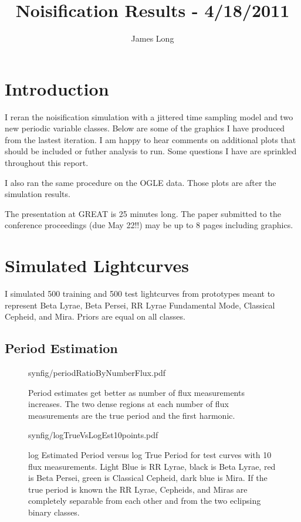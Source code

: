 \documentclass[10pt]{article}
\title{Noisification Results - 4/18/2011}
\date{}
\author{James Long}
\begin{document}
\maketitle
\section{Introduction}
I reran the noisification simulation with a jittered time sampling model and two new periodic variable classes. Below are some of the graphics I have produced from the lastest iteration. I am happy to hear comments on additional plots that should be included or futher analysis to run. Some questions I have are sprinkled throughout this report.

I also ran the same procedure on the OGLE data. Those plots are after the simulation results.


The presentation at GREAT is 25 minutes long. The paper submitted to the conference proceedings (due May 22!!) may be up to 8 pages including graphics.

\section{Simulated Lightcurves}

I simulated 500 training and 500 test lightcurves from prototypes meant to represent Beta Lyrae, Beta Persei, RR Lyrae Fundamental Mode, Classical Cepheid, and Mira. Priors are equal on all classes.

\subsection{Period Estimation}

\begin{figure}[H]
  \begin{center}
    \begin{includegraphics}[height=4in,width=4in]{synfig/periodRatioByNumberFlux.pdf}
      \caption{Period estimates get better as number of flux measurements increases. The two dense regions at each number of flux measurements are the true period and the first harmonic.\label{fig:periodRatioByNumberFluxSyn}}
    \end{includegraphics}
  \end{center}
\end{figure}


\begin{figure}[H]
  \begin{center}
    \begin{includegraphics}[height=4in,width=4in]{synfig/logTrueVsLogEst10points.pdf}
      \caption{log Estimated Period versus log True Period for test curves with 10 flux measurements. Light Blue is RR Lyrae, black is Beta Lyrae, red is Beta Persei, green is Classical Cepheid, dark blue is Mira. If the true period is known the RR Lyrae, Cepheids, and Miras are completely separable from each other and from the two eclipsing binary classes.\label{fig:logTrueVsLogEst10pointsSyn}}
    \end{includegraphics}
  \end{center}
\end{figure}
\end{document}
